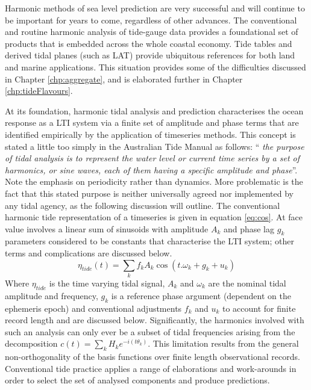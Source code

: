 Harmonic methods of sea level prediction are very successful and will continue to be important for years to come, regardless of other advances.  The conventional and routine harmonic analysis of tide-gauge data provides a foundational set of products that is embedded across the whole coastal economy. Tide tables and derived tidal planes (such as LAT) provide ubiquitous references for both land and marine applications. This situation provides some of the difficulties discussed in Chapter \ref{chp:aggregate}, and is elaborated further in  Chapter \ref{chp:tideFlavours}.


At its foundation, harmonic tidal analysis and prediction characterises the ocean response as a LTI system via a finite set of amplitude and phase terms that are identified empirically by the application of timeseries methods.   This concept is stated a little too simply in the Australian Tide Manual as follows: ``\textit{ the purpose of tidal analysis is to represent the water level or current time series by a set of harmonics, or sine waves, each of them having a specific amplitude and phase}''\citep{PCTMSL-sp9}.
Note the emphasis on periodicity rather than dynamics.  More problematic is the fact that this stated purpose is neither universally agreed nor implemented by any tidal agency, as the following discussion will outline.  
The conventional harmonic tide representation of a timeseries is given in equation \ref{eq:cos}.  At face value involves a linear sum of sinusoids with amplitude $A_k$ and phase lag $g_k$ parameters considered to be constants that characterise the LTI system; other terms and complications are discussed below.  
\begin{equation}
    \eta_{tide}(t) = \sum_{k} f_k A_k \cos ( t.\omega_k + g_k + u_k)
    \label{eq:cos}
\end{equation}
Where $\eta_{tide}$ is the time varying tidal signal, $A_k$ and $\omega_k$ are the nominal tidal amplitude and frequency, $g_k$ is a reference phase argument (dependent on the ephemeris epoch) and conventional adjustments $f_k$ and $u_k$ to account for finite record length and are discussed below. 
Significantly, the harmonics involved with such an analysis can only ever be a subset of tidal frequencies arising from the decomposition $c(t) = \sum_{k} H_{k} e^{-i( t\theta_{k})}$.  This limitation results from the general non-orthogonality of the basis functions over finite length observational records.
Conventional tide practice applies a range of elaborations and work-arounds in order to select the set of analysed components and produce predictions.  
